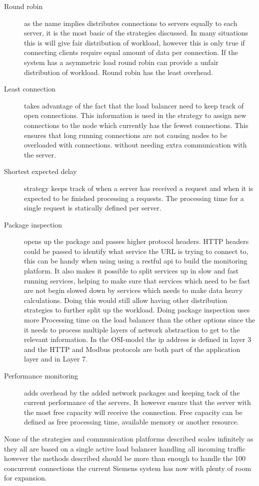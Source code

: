 \begin{description}
	\item[Round robin] as the name implies distributes connections to servers equally to each server, it is the most basic of the strategies discussed. In many situations this is will give fair distribution of workload, however this is only true if connecting clients require equal amount of data per connection. If the system has a asymmetric load round robin can provide a unfair distribution of workload. 
	Round robin has the least overhead.
	
	\item[Least connection] takes advantage of the fact that the load balancer need to keep track of open connections. This information is used in the strategy to assign new connections to the node which currently has the fewest connections.
	This ensures that long running connections are not causing nodes to be overloaded with connections.
	without needing extra communication with the server.
	
	\item[Shortest expected delay] strategy keeps track of when a server has received a request and when it is expected to be finished processing a requests. The processing time for a single request is statically defined per server.
	
	\item[Package inspection] opens up the package and passes higher protocol headers. HTTP headers could be passed to identify what service the URL is trying to connect to, this can be handy when using using a restful api to build the monitoring platform.
	It also makes it possible to split services up in slow and fast running services, helping to make sure that services which need to be fast are not begin slowed down by services which needs to make data heavy calculations.
	Doing this would still allow having other distribution strategies to further split up the workload.
	Doing package inspection uses more Processing time on the load balancer than the other options since the it needs to process multiple layers of network abstraction to get to the relevant information. In the OSI-model the ip address is defined in layer 3 and the HTTP and Modbus protocols are both part of the application layer and in Layer 7. 
	
	\item[Performance monitoring] adds overhead by the added network packages and keeping tack of the current performance of the servers. It however ensure that the server with the most free capacity will receive the connection. Free capacity can be defined as free processing time, available memory or another resource.
\end{description}
None of the strategies and communication platforms described scales infinitely as they all are based on a single active load balancer handling all incoming traffic however the methods described should be more than enough to handle the 100 concurrent connections the current Siemens system has now with plenty of room for expansion. 

